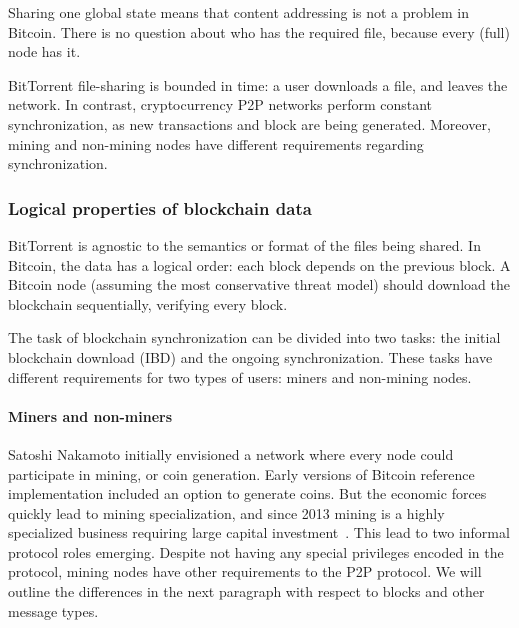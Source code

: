 Sharing one global state means that content addressing is not a problem in Bitcoin.
There is no question about who has the required file, because every (full) node has it.

BitTorrent file-sharing is bounded in time: a user downloads a file, and leaves the network.
In contrast, cryptocurrency P2P networks perform constant synchronization, as new transactions and block are being generated.
Moreover, mining and non-mining nodes have different requirements regarding synchronization.



\subsubsection{Logical properties of blockchain data}

BitTorrent is agnostic to the semantics or format of the files being shared.
In Bitcoin, the data has a logical order: each block depends on the previous block.
A Bitcoin node (assuming the most conservative threat model) should download the blockchain sequentially, verifying every block.

The task of blockchain synchronization can be divided into two tasks: the initial blockchain download (IBD) and the ongoing synchronization.
These tasks have different requirements for two types of users: miners and non-mining nodes.

\paragraph{Miners and non-miners}
Satoshi Nakamoto initially envisioned a network where every node could participate in mining, or coin generation.
Early versions of Bitcoin reference implementation included an option to generate coins.
But the economic forces quickly lead to mining specialization, and since 2013 mining is a highly specialized business requiring large capital investment~\cite{Kroll2013}.
This lead to two informal protocol roles emerging.
Despite not having any special privileges encoded in the protocol, mining nodes have other requirements to the P2P protocol.
We will outline the differences in the next paragraph with respect to blocks and other message types.
 

